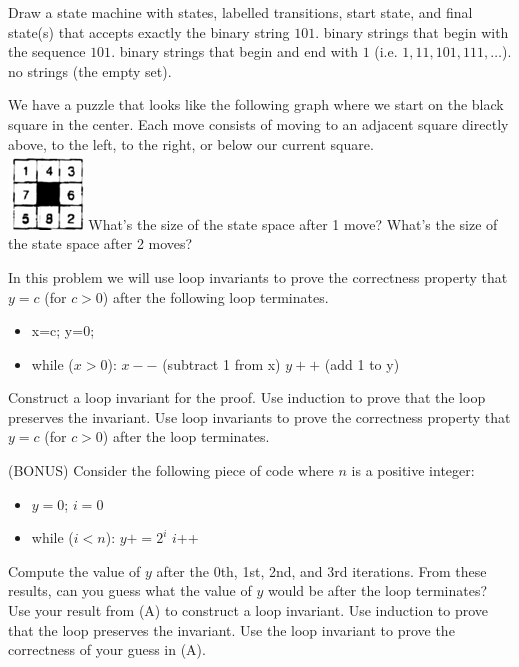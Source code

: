 \documentclass[solution, letterpaper]{cs20inclass}
\begin{document}
\pagebreak

\problem Draw a state machine with states, labelled transitions, start state, and final state(s) that accepts exactly
\subproblem the binary string $101$.
\subproblem binary strings that begin with the sequence $101$.
\subproblem binary strings that begin and end with $1$ (i.e. $1, 11, 101, 111,\ldots$).
\subproblem no strings (the empty set).

\problem We have a puzzle that looks like the following graph where we start on the black square in the center. Each move consists of moving to an adjacent square directly above, to the left, to the right, or below our current square.\\
\includegraphics[width=2cm]{initial}
\subproblem What's the size of the state space after 1 move?
\subproblem What's the size of the state space after 2 moves?

\problem In this problem we will use loop invariants to prove the correctness property that $y=c$ (for $c>0$) after the following loop terminates.
\begin{itemize}
\item x=c; y=0;
\item while ($x>0$):
\subitem $x--$ (subtract 1 from x)
\subitem $y++$ (add 1 to y)
\end{itemize}
\subproblem Construct a loop invariant for the proof.
\subproblem Use induction to prove that the loop preserves the invariant.
\subproblem Use loop invariants to prove the correctness property that $y=c$ (for $c>0$) after the loop terminates.
\pagebreak

\problem (BONUS) Consider the following piece of code where $n$ is a positive integer:
\begin{itemize}
\item $y=0$; $i=0$
\item while ($i< n$):
\subitem $y += 2^i$
\subitem $i$++
\end{itemize}
\subproblem Compute the value of $y$ after the 0th, 1st, 2nd, and 3rd iterations. From these results, can you guess what the value of $y$ would be after the loop terminates?
\subproblem Use your result from (A) to construct a loop invariant.
\subproblem Use induction to prove that the loop preserves the invariant.
\subproblem Use the loop invariant to prove the correctness of your guess in (A).
\end{document}
